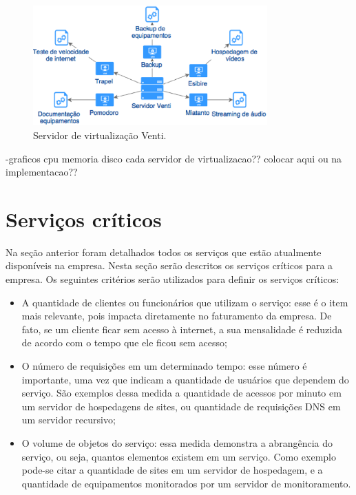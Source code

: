 \begin{figure}[h!]
 \centering
 \includegraphics[width=340px]{img/servidor_venti.eps}
 \caption{Servidor de virtualização Venti.}
 \label{fig:servidor_venti}
\end{figure}

-graficos cpu memoria disco cada servidor de virtualizacao?? colocar aqui ou na implementacao??

\section{Serviços críticos}
\label{section:servcrit}

Na seção anterior foram detalhados todos os serviços que estão atualmente disponíveis na empresa. Nesta seção serão descritos os serviços críticos 
para a empresa. Os seguintes critérios serão utilizados para definir os serviços críticos: 
\begin{itemize}
 \item A quantidade de clientes ou funcionários que utilizam o serviço: esse é o item mais relevante, pois impacta diretamente no faturamento
 da empresa. De fato, se um cliente ficar sem acesso à internet, a sua mensalidade é reduzida de acordo com o tempo que ele ficou sem acesso; 
 \item O número de requisições em um determinado tempo: esse número é importante, uma vez que indicam a quantidade de usuários que dependem do 
 serviço. São exemplos dessa medida a quantidade de acessos por minuto em um servidor de hospedagens de sites, ou quantidade de requisições 
 \ac{DNS} em um servidor recursivo;
 \item O volume de objetos do serviço: essa medida demonstra a abrangência do serviço, ou seja, quantos elementos existem em um serviço.
 Como exemplo pode-se citar a quantidade de sites em um servidor de hospedagem, e a quantidade de equipamentos monitorados por um servidor 
 de monitoramento.
\end{itemize}

